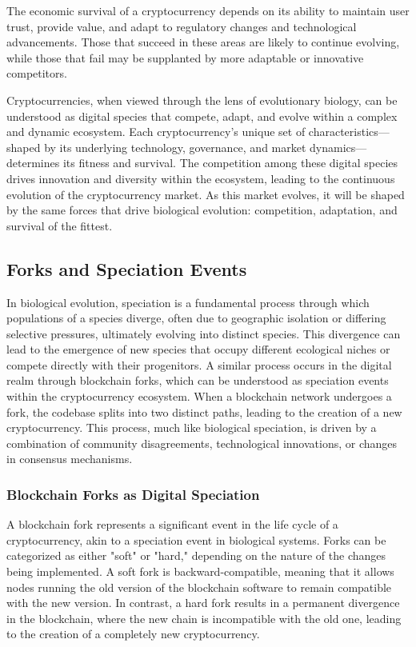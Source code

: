 \documentclass[12pt,twoside]{article}
\begin{document}
The economic survival of a cryptocurrency depends on its ability to maintain user trust, provide value, and adapt to regulatory changes and technological advancements. Those that succeed in these areas are likely to continue evolving, while those that fail may be supplanted by more adaptable or innovative competitors.

Cryptocurrencies, when viewed through the lens of evolutionary biology, can be understood as digital species that compete, adapt, and evolve within a complex and dynamic ecosystem. Each cryptocurrency's unique set of characteristics—shaped by its underlying technology, governance, and market dynamics—determines its fitness and survival. The competition among these digital species drives innovation and diversity within the ecosystem, leading to the continuous evolution of the cryptocurrency market. As this market evolves, it will be shaped by the same forces that drive biological evolution: competition, adaptation, and survival of the fittest.

\subsection{Forks and Speciation Events}

In biological evolution, speciation is a fundamental process through which populations of a species diverge, often due to geographic isolation or differing selective pressures, ultimately evolving into distinct species. This divergence can lead to the emergence of new species that occupy different ecological niches or compete directly with their progenitors. A similar process occurs in the digital realm through blockchain forks, which can be understood as speciation events within the cryptocurrency ecosystem. When a blockchain network undergoes a fork, the codebase splits into two distinct paths, leading to the creation of a new cryptocurrency. This process, much like biological speciation, is driven by a combination of community disagreements, technological innovations, or changes in consensus mechanisms.

\subsubsection{Blockchain Forks as Digital Speciation}

A blockchain fork represents a significant event in the life cycle of a cryptocurrency, akin to a speciation event in biological systems. Forks can be categorized as either "soft" or "hard," depending on the nature of the changes being implemented. A soft fork is backward-compatible, meaning that it allows nodes running the old version of the blockchain software to remain compatible with the new version. In contrast, a hard fork results in a permanent divergence in the blockchain, where the new chain is incompatible with the old one, leading to the creation of a completely new cryptocurrency.
\end{document}
